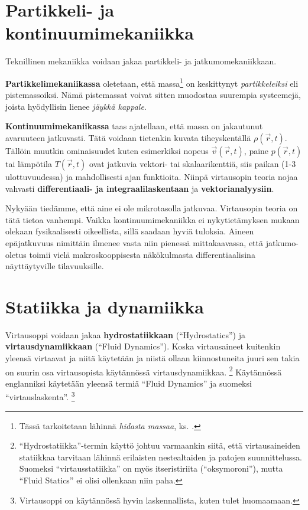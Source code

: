 \documentclass[12pt,a4paper,finnish]{book}
\begin{document}
\section{Partikkeli- ja kontinuumimekaniikka}
Teknillinen mekaniikka voidaan jakaa partikkeli- ja jatkumomekaniikkaan. 

\textbf{Partikkelimekaniikassa} oletetaan, 
että massa\footnote{Tässä tarkoitetaan lähinnä \textit{hidasta massaa}, ks. .} on 
keskittynyt \textit{partikkeleiksi} eli pistemassoiksi. Nämä pistemassat voivat sitten muodostaa 
suurempia systeemejä, joista hyödyllisin lienee \textit{jäykkä kappale}.

\textbf{Kontinuumimekaniikassa} taas ajatellaan, että massa on jakautunut avaruuteen jatkuvasti. 
Tätä voidaan tietenkin kuvata tiheyskentällä \(\rho(\vec{r}, t)\). Tällöin muutkin ominaisuudet kuten 
esimerkiksi nopeus \(\vec{v}(\vec{r}, t)\), paine \(p(\vec{r}, t)\) tai lämpötila \(T(\vec{r}, t)\) 
ovat jatkuvia vektori- tai skalaarikenttiä, siis paikan (1-3 ulottuvuudessa) ja mahdollisesti 
ajan funktioita. Niinpä virtausopin teoria nojaa vahvasti \textbf{differentiaali- ja integraalilaskentaan} 
ja \textbf{vektorianalyysiin}.

Nykyään tiedämme, että aine ei ole mikrotasolla jatkuvaa. Virtausopin teoria on tätä tietoa vanhempi. 
Vaikka kontinuumimekaniikka ei nykytietämyksen mukaan olekaan fysikaalisesti oikeellista, sillä 
saadaan hyviä tuloksia. Aineen epäjatkuvuus nimittäin ilmenee vasta niin pienessä mittakaavassa, 
että jatkumo-oletus toimii vielä makroskooppisesta näkökulmasta differentiaalisina näyttäytyville 
tilavuuksille.

\section{Statiikka ja dynamiikka}
Virtausoppi voidaan jakaa \textbf{hydrostatiikkaan} (``Hydrostatics'') ja \textbf{virtausdynamiikkaan} 
(``Fluid Dynamics''). Koska virtausaineet kuitenkin yleensä virtaavat ja niitä käytetään ja niistä 
ollaan kiinnostuneita juuri sen takia on suurin osa virtausopista käytännössä virtausdynamiikkaa.
\footnote{``Hydrostatiikka''-termin käyttö johtuu varmaankin siitä, että virtausaineiden statiikkaa 
tarvitaan lähinnä erilaisten nestealtaiden ja patojen suunnittelussa. Suomeksi ``virtausstatiikka'' 
on myös itseristiriita (``oksymoroni''), mutta ``Fluid Statics'' ei olisi ollenkaan niin paha.}
Käytännössä englanniksi käytetään yleensä termiä ``Fluid Dynamics'' ja suomeksi ``virtauslaskenta''.
\footnote{Virtausoppi on käytännössä hyvin laskennallista, kuten tulet huomaamaan.}
\end{document}
